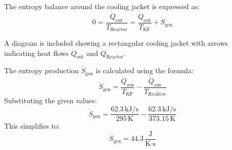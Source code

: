 The entropy balance around the cooling jacket is expressed as:  
\[
0 = \frac{\dot{Q}_{\text{out}}}{T_{\text{Reactor}}} = \frac{\dot{Q}_{\text{out}}}{T_{\text{KF}}} + \dot{S}_{\text{gen}}
\]  

A diagram is included showing a rectangular cooling jacket with arrows indicating heat flows \( \dot{Q}_{\text{out}} \) and \( \dot{Q}_{\text{Reactor}} \).

The entropy production \( \dot{S}_{\text{gen}} \) is calculated using the formula:  
\[
\dot{S}_{\text{gen}} = \frac{\dot{Q}_{\text{aus}}}{T_{\text{KF}}} - \frac{\dot{Q}_{\text{aus}}}{T_{\text{Reaktor}}}
\]  
Substituting the given values:  
\[
\dot{S}_{\text{gen}} = \frac{62.3 \, \text{kJ/s}}{295 \, \text{K}} - \frac{62.3 \, \text{kJ/s}}{373.15 \, \text{K}}
\]  
This simplifies to:  
\[
\dot{S}_{\text{gen}} = 44.3 \, \frac{\text{J}}{\text{K·s}}
\]